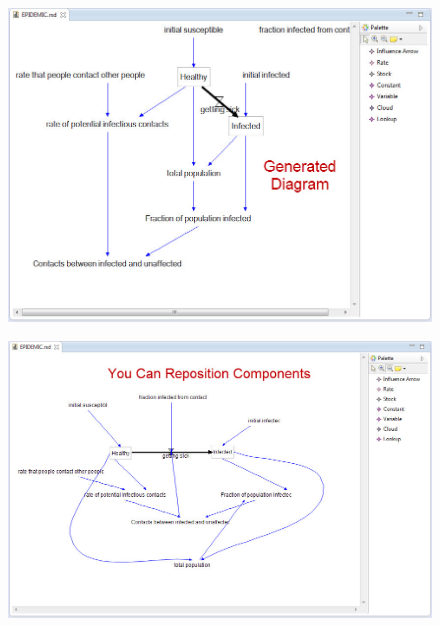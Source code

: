 \documentclass[11pt]{amsart}
\begin{document}
\begin{figure}[ht]
\begin{center}
\vspace{.2in}
\centerline {
\includegraphics[totalheight=0.3\textheight]{images/047.jpg}
}
\caption{}
\label{fig:047}
\end{center}
\end{figure}




\begin{figure}[ht]
\begin{center}
\vspace{.2in}
\centerline {
\includegraphics[totalheight=0.3\textheight]{images/048.jpg}
}
\caption{}
\label{fig:048}
\end{center}
\end{figure}
\end{document}
